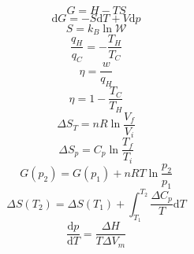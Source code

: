 \documentclass[12pt, letterpaper]{memoir}
\begin{document}
\vspace{-1em}
\noindent
\begin{minipage}{0.5\linewidth}
	\begin{equation*}
		G = H-TS
	\end{equation*}
	\begin{equation*}
		\mathrm{d}G=-S\mathrm{d}T+V\mathrm{d}p
	\end{equation*}
	\begin{equation*}
		S=k_B\ln \mathcal{W}
	\end{equation*}	
	\begin{equation*}
		\dfrac{q_H}{q_C}=-\dfrac{T_H}{T_C}
	\end{equation*}	
	\begin{equation*}
		\eta = \dfrac{w}{q_H}
	\end{equation*}	
	\begin{equation*}
		\eta = 1 - \dfrac{T_C}{T_H}
	\end{equation*}	
	\begin{equation*}
		\Delta S_T=nR\ln\dfrac{V_f}{V_i}
	\end{equation*}	
	\begin{equation*}
		\Delta S_p=C_p\ln\dfrac{T_f}{T_i}
	\end{equation*}	
	\begin{equation*}
		G(p_2) = G(p_1)+nRT\ln\dfrac{p_2}{p_1}
	\end{equation*}
	\begin{equation*}
		\Delta S(T_2) = \Delta S(T_1) + \int_{T_1}^{T_2} \! \dfrac{\Delta C_{p}}{T}\mathrm{d}T
	\end{equation*}
	\begin{equation*}
		\dfrac{\mathrm{d}p}{\mathrm{d}T}=\dfrac{\Delta H}{T\Delta V_m}
	\end{equation*}
\end{minipage}
\end{document}
